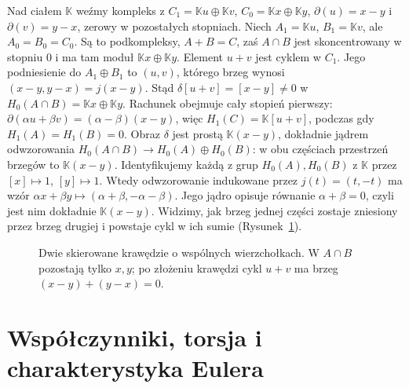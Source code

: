 \begin{przyklad}
\label{prz:mv-niezerowa-delta}
Nad ciałem $\mathbb K$ weźmy kompleks
z $C_1=\mathbb K u\oplus\mathbb K v$,
$C_0=\mathbb K x\oplus\mathbb K y$,
$\partial(u)=x-y$ i $\partial(v)=y-x$,
zerowy w pozostałych stopniach.
Niech $A_1=\mathbb K u$, $B_1=\mathbb K v$,
ale $A_0=B_0=C_0$. Są to podkompleksy,
$A+B=C$, zaś $A\cap B$ jest
skoncentrowany w stopniu $0$
i ma tam moduł $\mathbb K x\oplus\mathbb K y$.
Element $u+v$ jest cyklem w $C_1$.
Jego podniesienie do $A_1\oplus B_1$ to $(u,v)$,
którego brzeg wynosi
$(x-y,y-x)=j(x-y)$. Stąd
$\delta[u+v]=[x-y]\ne0$ w
$H_0(A\cap B)=\mathbb K x\oplus\mathbb K y$.
Rachunek obejmuje cały stopień pierwszy:
$\partial(\alpha u+\beta v)=(\alpha-\beta)(x-y)$,
więc $H_1(C)=\mathbb K[u+v]$,
podczas gdy $H_1(A)=H_1(B)=0$.
Obraz $\delta$ jest prostą $\mathbb K(x-y)$,
dokładnie jądrem odwzorowania
$H_0(A\cap B)\to H_0(A)\oplus H_0(B)$:
w obu częściach przestrzeń brzegów to $\mathbb K(x-y)$.
Identyfikujemy każdą z grup $H_0(A),H_0(B)$ z $\mathbb K$
przez $[x]\mapsto1$, $[y]\mapsto1$.
Wtedy odwzorowanie indukowane przez $j(t)=(t,-t)$ ma wzór
$\alpha x+\beta y\mapsto(\alpha+\beta,-\alpha-\beta)$.
Jego jądro opisuje równanie $\alpha+\beta=0$,
czyli jest nim dokładnie $\mathbb K(x-y)$.
Widzimy, jak brzeg
jednej części zostaje zniesiony
przez brzeg drugiej i powstaje
cykl w ich sumie (Rysunek~\ref{fig:mv-dwa-luki}).
\end{przyklad}

\begin{figure}[htbp]
\centering
{}
\caption{Dwie skierowane krawędzie o wspólnych wierzchołkach.
 W $A\cap B$ pozostają tylko $x,y$; po złożeniu krawędzi
 cykl $u+v$ ma brzeg $(x-y)+(y-x)=0$.}
\label{fig:mv-dwa-luki}
\end{figure}

\section{Współczynniki, torsja i charakterystyka Eulera}
\label{sec:wspolczynniki-euler}

